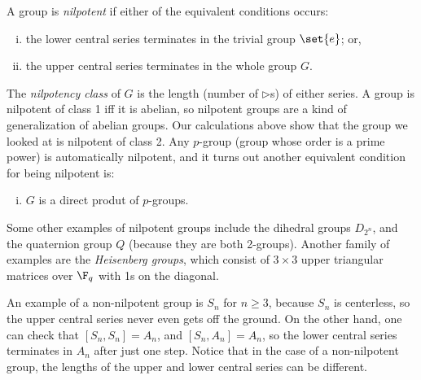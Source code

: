 A group is \emph{nilpotent} if either of the equivalent conditions occurs:
\begin{enumerate}[(i)]
    \item the lower central series terminates in the trivial group $\set{e}$; or,
    \item the upper central series terminates in the whole group $G$.
\end{enumerate}
The \emph{nilpotency class} of $G$ is the length (number of $\triangleright$s) of either series. A group is nilpotent of class 1 iff it is abelian, so nilpotent groups are a kind of generalization of abelian groups. Our calculations above show that the group we looked at is nilpotent of class 2. Any $p$-group (group whose order is a prime power) is automatically nilpotent, and it turns out another equivalent condition for being nilpotent is:
\begin{enumerate}[(i),resume]
    \item $G$ is a direct produt of $p$-groups.
\end{enumerate}

Some other examples of nilpotent groups include the dihedral groups $D_{2^n}$, and the quaternion group $Q$ (because they are both 2-groups). Another family of examples are the \emph{Heisenberg groups}, which consist of $3 \times 3$ upper triangular matrices over $\F_q$ with 1s on the diagonal.

An example of a non-nilpotent group is $S_n$ for $n \geq 3$, because $S_n$ is centerless, so the upper central series never even gets off the ground. On the other hand, one can check that $[S_n,S_n] = A_n$, and $[S_n,A_n] = A_n$, so the lower central series terminates in $A_n$ after just one step. Notice that in the case of a non-nilpotent group, the lengths of the upper and lower central series can be different.